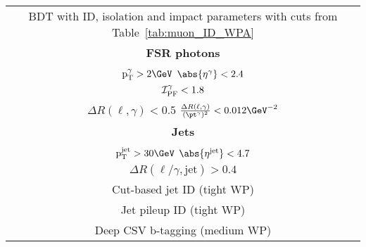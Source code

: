 \begin{table}[H]
\begin{tabular}{|c|c|}
                \multicolumn{2}{|c|}{BDT with ID, isolation and impact parameters with cuts from Table~\ref{tab:muon_ID_WPA}  }    \\ 
		\multicolumn{2}{|c|}{\textbf{FSR photons}}                                                                                                                                                                                  \\ \hline
		\multicolumn{2}{|c|}{$\mathrm{p_T^{\gamma}} > 2 \GeV$ \hspace{0.5cm} $\abs{\eta^{\gamma}} < 2.4$}                                                                                                                                 \\
		\multicolumn{2}{|c|}{$\ensuremath{{\cal I}_{\mathrm{PF}}^{\gamma}} < 1.8$}                                                                                                                                         \\
		\multicolumn{2}{|c|}{$\Delta R(\ell,\gamma) < 0.5$ \hspace{0.5cm} $\frac{\Delta R(\ell,\gamma)}{(\pt^{\gamma})^2} < 0.012 \GeV^{-2}$}                                                                                             \\ \hline \hline
		\multicolumn{2}{|c|}{\textbf{Jets}}                                                                                                                                                                                         \\ \hline
		\multicolumn{2}{|c|}{$\mathrm{p_T^{\mathrm{jet}}} > 30 \GeV$ \hspace{0.5cm} $\abs{\eta^{\mathrm{jet}}} < 4.7$}                                                                                                                    \\
		\multicolumn{2}{|c|}{$\Delta R(\ell/\gamma, \mathrm{jet}) > 0.4$} \\
                \multicolumn{2}{|c|}{Cut-based jet ID (tight WP) } \\
                \multicolumn{2}{|c|}{Jet pileup ID (tight WP)} \\
                \multicolumn{2}{|c|}{Deep CSV b-tagging (medium WP)} \\

\end{tabular}
\end{table}
